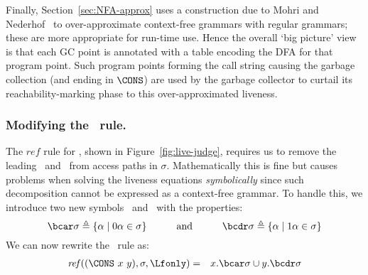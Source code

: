 \documentclass{llncs}
\begin{document}
Finally,  Section~\ref{sec:NFA-approx}
uses a construction due to
Mohri and Nederhof~\cite{mohri00regular} to over-approximate
context-free grammars with regular grammars;
these are more appropriate for run-time use.
%
Hence the overall `big picture' view is that each GC point
is annotated with a table encoding the DFA for that program point.
Such program points forming the call string causing the garbage collection
(and ending in $\CONS$)
are used by the garbage collector to curtail its reachability-marking phase
to this over-approximated liveness.


\subsubsection{Modifying the \CONS\ rule.}

The    $\mathit{ref}$    rule for \CONS,    shown    in
Figure~\ref{fig:live-judge},  requires  us  to remove  the  leading
\acar\  and  \acdr\  from  access paths in  $\sigma$.
  Mathematically  this  is fine  but causes problems  when
  solving  the liveness equations  {\em symbolically}  since such
  decomposition cannot be expressed as a context-free grammar.  
To  handle this,  we introduce  two  new symbols  \bcar\  and
\bcdr\ with the properties:
\[
 \bcar\sigma \triangleq \{\alpha \mid 0\alpha \in \sigma\}
\hspace{3em} \mbox{and} \hspace{3em}
 \bcdr\sigma \triangleq \{\alpha \mid 1\alpha \in \sigma\}
\]
We can now rewrite the \CONS\ rule as:
\begin{eqnarray*}
\mathit{ref\/}((\CONS~x~y),\sigma,\Lfonly)
&=& x.\bcar\sigma \cup y.\bcdr\sigma  \label{eqn:mod-cons}
\end{eqnarray*}
\end{document}

